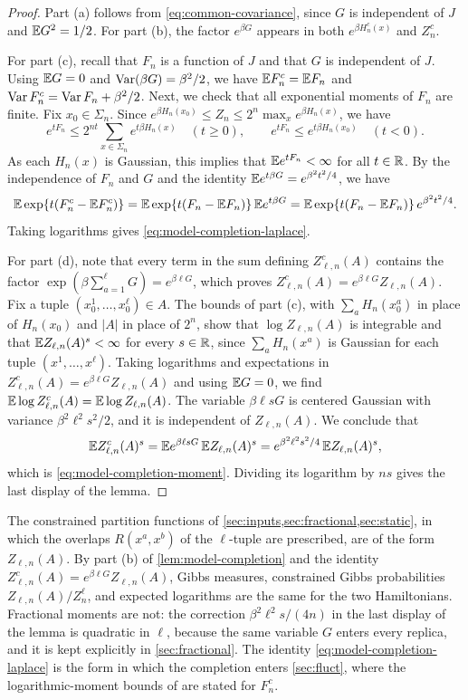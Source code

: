 \begin{proof}
Part (a) follows from \eqref{eq:common-covariance}, since $G$ is independent of $J$ and $\mathbb E G^2=1/2$. For part (b), the factor $e^{\beta G}$ appears in both $e^{\beta H_n^c(x)}$ and $Z_n^c$.

For part (c), recall that $F_n$ is a function of $J$ and that $G$ is independent of $J$. Using $\mathbb E G=0$ and $\operatorname{Var}(\beta G)=\beta^2/2$, we have $\mathbb E F_n^c=\mathbb E F_n$ and $\operatorname{Var} F_n^c=\operatorname{Var} F_n+\beta^2/2$. Next, we check that all exponential moments of $F_n$ are finite. Fix $x_0\in\Sigma_n$. Since $e^{\beta H_n(x_0)}\le Z_n\le2^n\max_xe^{\beta H_n(x)}$, we have
\[
 e^{tF_n}\le2^{nt}\sum_{x\in\Sigma_n}e^{t\beta H_n(x)}\quad(t\ge0),\qquad
 e^{tF_n}\le e^{t\beta H_n(x_0)}\quad(t<0).
\]
As each $H_n(x)$ is Gaussian, this implies that $\mathbb E e^{tF_n}<\infty$ for all $t\in\mathbb R$. By the independence of $F_n$ and $G$ and the identity $\mathbb E e^{t\beta G}=e^{\beta^2t^2/4}$, we have
\[
 \mathbb E\exp\{t(F_n^c-\mathbb E F_n^c)\}
 =\mathbb E\exp\{t(F_n-\mathbb E F_n)\}\,\mathbb E e^{t\beta G}
 =\mathbb E\exp\{t(F_n-\mathbb E F_n)\}\,e^{\beta^2t^2/4}.
\]
Taking logarithms gives \eqref{eq:model-completion-laplace}.

For part (d), note that every term in the sum defining $Z_{\ell,n}^c(A)$ contains the factor $\exp(\beta\sum_{a=1}^\ell G)=e^{\beta\ell G}$, which proves $Z^c_{\ell,n}(A)=e^{\beta\ell G}Z_{\ell,n}(A)$. Fix a tuple $(x_0^1,\dots,x_0^\ell)\in A$. The bounds of part (c), with $\sum_aH_n(x_0^a)$ in place of $H_n(x_0)$ and $|A|$ in place of $2^n$, show that $\log Z_{\ell,n}(A)$ is integrable and that $\mathbb E Z_{\ell,n}(A)^s<\infty$ for every $s\in\mathbb R$, since $\sum_aH_n(x^a)$ is Gaussian for each tuple $(x^1,\dots,x^\ell)$. Taking logarithms and expectations in $Z^c_{\ell,n}(A)=e^{\beta\ell G}Z_{\ell,n}(A)$ and using $\mathbb E G=0$, we find $\mathbb E\log Z^c_{\ell,n}(A)=\mathbb E\log Z_{\ell,n}(A)$. The variable $\beta\ell sG$ is centered Gaussian with variance $\beta^2\ell^2s^2/2$, and it is independent of $Z_{\ell,n}(A)$. We conclude that
\[
 \mathbb E Z^c_{\ell,n}(A)^s=\mathbb E e^{\beta\ell sG}\,\mathbb E Z_{\ell,n}(A)^s=e^{\beta^2\ell^2s^2/4}\,\mathbb E Z_{\ell,n}(A)^s,
\]
which is \eqref{eq:model-completion-moment}. Dividing its logarithm by $ns$ gives the last display of the lemma.
\end{proof}

The constrained partition functions of \cref{sec:inputs,sec:fractional,sec:static}, in which the overlaps $R(x^a,x^b)$ of the $\ell$-tuple are prescribed, are of the form $Z_{\ell,n}(A)$. By part (b) of \cref{lem:model-completion} and the identity $Z^c_{\ell,n}(A)=e^{\beta\ell G}Z_{\ell,n}(A)$, Gibbs measures, constrained Gibbs probabilities $Z_{\ell,n}(A)/Z_n^\ell$, and expected logarithms are the same for the two Hamiltonians. Fractional moments are not: the correction $\beta^2\ell^2s/(4n)$ in the last display of the lemma is quadratic in $\ell$, because the same variable $G$ enters every replica, and it is kept explicitly in \cref{sec:fractional}. The identity \eqref{eq:model-completion-laplace} is the form in which the completion enters \cref{sec:fluct}, where the logarithmic-moment bounds of \cite{oai-fluctuations} are stated for $F_n^c$.


